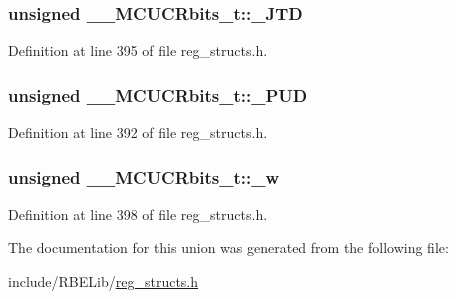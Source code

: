 \hypertarget{union_____m_c_u_c_rbits__t_a2020211e426b9ba4fedb7fcc93b54b70}{
\subsubsection[{\+\_\+\+J\+T\+D}]{\setlength{\rightskip}{0pt plus 5cm}unsigned \+\_\+\+\_\+\+M\+C\+U\+C\+Rbits\+\_\+t\+::\+\_\+\+J\+T\+D}}\label{union_____m_c_u_c_rbits__t_a2020211e426b9ba4fedb7fcc93b54b70}


Definition at line 395 of file reg\+\_\+structs.\+h.

\hypertarget{union_____m_c_u_c_rbits__t_a896644c4a7715868daa9c586dfa6febe}{
\subsubsection[{\+\_\+\+P\+U\+D}]{\setlength{\rightskip}{0pt plus 5cm}unsigned \+\_\+\+\_\+\+M\+C\+U\+C\+Rbits\+\_\+t\+::\+\_\+\+P\+U\+D}}\label{union_____m_c_u_c_rbits__t_a896644c4a7715868daa9c586dfa6febe}


Definition at line 392 of file reg\+\_\+structs.\+h.

\hypertarget{union_____m_c_u_c_rbits__t_a316f8409489efa58c40da257fba7cd39}{
\subsubsection[{\+\_\+w}]{\setlength{\rightskip}{0pt plus 5cm}unsigned \+\_\+\+\_\+\+M\+C\+U\+C\+Rbits\+\_\+t\+::\+\_\+w}}\label{union_____m_c_u_c_rbits__t_a316f8409489efa58c40da257fba7cd39}


Definition at line 398 of file reg\+\_\+structs.\+h.



The documentation for this union was generated from the following file\+:\begin{DoxyCompactItemize}
\item 
include/\+R\+B\+E\+Lib/\hyperlink{reg__structs_8h}{reg\+\_\+structs.\+h}\end{DoxyCompactItemize}
